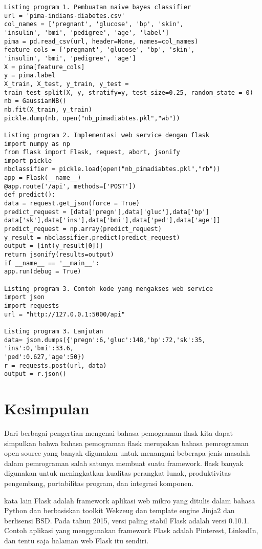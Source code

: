 \documentclass[12pt]{article}
\begin{document}
\begin{verbatim}
Listing program 1. Pembuatan naive bayes classifier
url = 'pima-indians-diabetes.csv'
col_names = ['pregnant', 'glucose', 'bp', 'skin',
'insulin', 'bmi', 'pedigree', 'age', 'label']
pima = pd.read_csv(url, header=None, names=col_names)
feature_cols = ['pregnant', 'glucose', 'bp', 'skin',
'insulin', 'bmi', 'pedigree', 'age']
X = pima[feature_cols]
y = pima.label
X_train, X_test, y_train, y_test =
train_test_split(X, y, stratify=y, test_size=0.25, random_state = 0)
nb = GaussianNB()
nb.fit(X_train, y_train)
pickle.dump(nb, open("nb_pimadiabtes.pkl","wb"))

Listing program 2. Implementasi web service dengan flask
import numpy as np
from flask import Flask, request, abort, jsonify
import pickle
nbclassifier = pickle.load(open("nb_pimadiabtes.pkl","rb"))
app = Flask(__name__)
@app.route('/api', methods=['POST'])
def predict():
data = request.get_json(force = True)
predict_request = [data['pregn'],data['gluc'],data['bp']
data['sk'],data['ins'],data['bmi'],data['ped'],data['age']]
predict_request = np.array(predict_request)
y_result = nbclassifier.predict(predict_request)
output = [int(y_result[0])]
return jsonify(results=output)
if __name__ == '__main__':
app.run(debug = True)

Listing program 3. Contoh kode yang mengakses web service
import json
import requests
url = "http://127.0.0.1:5000/api"

Listing program 3. Lanjutan
data= json.dumps({'pregn':6,'gluc':148,'bp':72,'sk':35,
'ins':0,'bmi':33.6,
'ped':0.627,'age':50})
r = requests.post(url, data)
output = r.json()
\end{verbatim}






\section{Kesimpulan}
Dari berbagai pengertian mengenai bahasa pemograman flask kita dapat simpulkan bahwa bahasa pemograman flask merupakan bahasa pemrograman open source yang banyak digunakan untuk menangani beberapa jenis masalah dalam pemrograman salah satunya membuat suatu framework. flask banyak digunakan untuk meningkatkan kualitas perangkat lunak, produktivitas pengembang, portabilitas program, dan integrasi komponen.

kata lain Flask adalah framework aplikasi web mikro yang ditulis dalam bahasa Python dan berbasiskan toolkit Wekzeug dan template engine Jinja2 dan berlisensi BSD. Pada tahun 2015, versi paling stabil Flask adalah versi 0.10.1. Contoh aplikasi yang menggunakan framework Flask adalah Pinterest, LinkedIn, dan tentu saja halaman web Flask itu sendiri.
\end{document}

